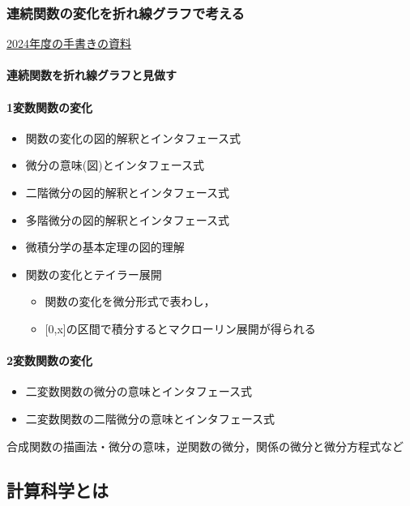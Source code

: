 \documentclass[dvipdfmx,11pat]{jarticle}
\begin{document}
\subsubsection{連続関数の変化を折れ線グラフで考える}
\label{sec:orgb17e59c}

\href{./docs/diff-descrete.pdf}{2024年度の手書きの資料}
\paragraph{連続関数を折れ線グラフと見做す}
\label{sec:org6e4aff4}

\paragraph{1変数関数の変化}
\label{sec:org65143b3}
\begin{itemize}
\item 関数の変化の図的解釈とインタフェース式

\item 微分の意味(図)とインタフェース式

\item 二階微分の図的解釈とインタフェース式

\item 多階微分の図的解釈とインタフェース式

\item 微積分学の基本定理の図的理解

\item 関数の変化とテイラー展開
\begin{itemize}
\item 関数の変化を微分形式で表わし，
\item {[}0,x]の区間で積分するとマクローリン展開が得られる
\end{itemize}
\end{itemize}
\paragraph{2変数関数の変化}
\label{sec:org189f0e3}
\begin{itemize}
\item 二変数関数の微分の意味とインタフェース式
\item 二変数関数の二階微分の意味とインタフェース式
\end{itemize}

合成関数の描画法・微分の意味，逆関数の微分，関係の微分と微分方程式など
\subsection{計算科学とは}
\label{sec:orgdf87a9b}
\end{document}
